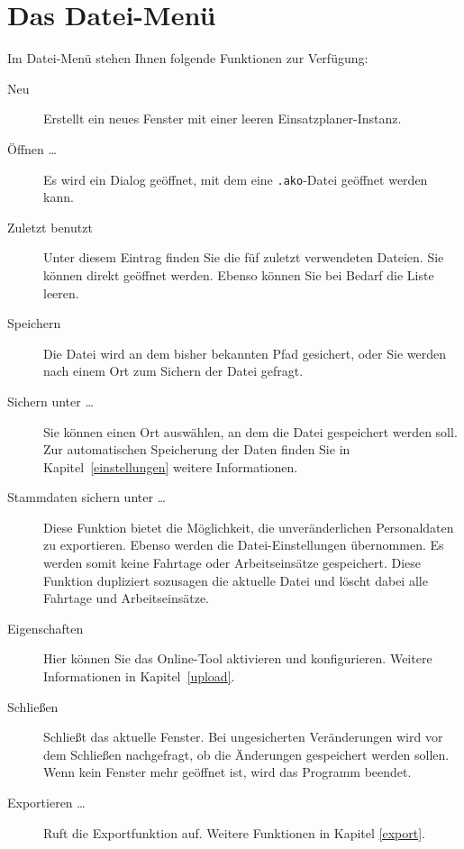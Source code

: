 \section{Das Datei-Menü}
Im Datei-Menü stehen Ihnen folgende Funktionen zur Verfügung:
\begin{description}
  \item[Neu]
  Erstellt ein neues Fenster mit einer leeren Einsatzplaner-Instanz.

  \item[Öffnen \dots]
  Es wird ein Dialog geöffnet, mit dem eine \texttt{.ako}-Datei geöffnet werden kann.

  \item[Zuletzt benutzt]
  Unter diesem Eintrag finden Sie die füf zuletzt verwendeten Dateien.
  Sie können direkt geöffnet werden.
  Ebenso können Sie bei Bedarf die Liste leeren.

  \item[Speichern]
  Die Datei wird an dem bisher bekannten Pfad gesichert, oder Sie werden nach einem Ort zum Sichern der Datei gefragt.

  \item[Sichern unter \dots]
  Sie können einen Ort auswählen, an dem die Datei gespeichert werden soll.
  Zur automatischen Speicherung der Daten finden Sie in Kapitel~\ref{einstellungen} weitere Informationen.

  \item[Stammdaten sichern unter \dots]
  Diese Funktion bietet die Möglichkeit, die unveränderlichen Personaldaten zu exportieren.
  Ebenso werden die Datei-Einstellungen übernommen.
  Es werden somit keine Fahrtage oder Arbeitseinsätze gespeichert.
  Diese Funktion dupliziert sozusagen die aktuelle Datei und löscht dabei alle Fahrtage und Arbeitseinsätze.


  \item[Eigenschaften]
  Hier können Sie das Online-Tool aktivieren und konfigurieren.
  Weitere Informationen in Kapitel~\ref{upload}.

  \item[Schließen]
  Schließt das aktuelle Fenster.
  Bei ungesicherten Veränderungen wird vor dem Schließen nachgefragt, ob die Änderungen gespeichert werden sollen.
  Wenn kein Fenster mehr geöffnet ist, wird das Programm beendet.

  \item[Exportieren \dots]
  Ruft die Exportfunktion auf.
  Weitere Funktionen in Kapitel \ref{export}.
\end{description}
